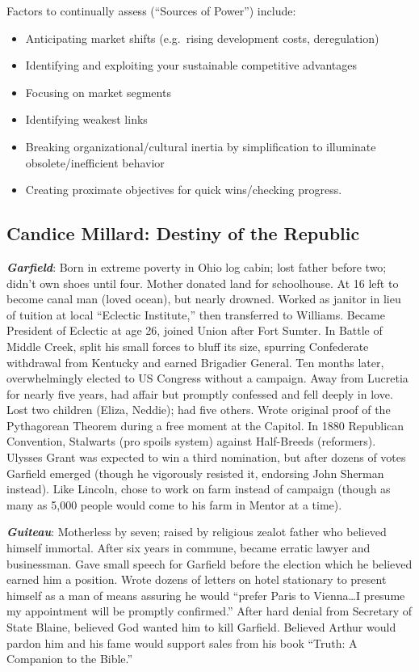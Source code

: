 \documentclass[
]{article}
\begin{document}
Factors to continually assess (``Sources of Power'') include:

\begin{itemize}
\item
  Anticipating market shifts (e.g.~rising development costs,
  deregulation)
\item
  Identifying and exploiting your sustainable competitive advantages
\item
  Focusing on market segments
\item
  Identifying weakest links
\item
  Breaking organizational/cultural inertia by simplification to
  illuminate obsolete/inefficient behavior
\item
  Creating proximate objectives for quick wins/checking progress.
\end{itemize}

\hypertarget{candice-millard-destiny-of-the-republic}{%
\subsection{Candice Millard: Destiny of the
Republic}\label{candice-millard-destiny-of-the-republic}}

\textbf{\emph{Garfield}}: Born in extreme poverty in Ohio log cabin;
lost father before two; didn't own shoes until four. Mother donated land
for schoolhouse. At 16 left to become canal man (loved ocean), but
nearly drowned. Worked as janitor in lieu of tuition at local ``Eclectic
Institute,'' then transferred to Williams. Became President of Eclectic
at age 26, joined Union after Fort Sumter. In Battle of Middle Creek,
split his small forces to bluff its size, spurring Confederate
withdrawal from Kentucky and earned Brigadier General. Ten months later,
overwhelmingly elected to US Congress without a campaign. Away from
Lucretia for nearly five years, had affair but promptly confessed and
fell deeply in love. Lost two children (Eliza, Neddie); had five others.
Wrote original proof of the Pythagorean Theorem during a free moment at
the Capitol. In 1880 Republican Convention, Stalwarts (pro spoils
system) against Half-Breeds (reformers). Ulysses Grant was expected to
win a third nomination, but after dozens of votes Garfield emerged
(though he vigorously resisted it, endorsing John Sherman instead). Like
Lincoln, chose to work on farm instead of campaign (though as many as
5,000 people would come to his farm in Mentor at a time).

\textbf{\emph{Guiteau}}: Motherless by seven; raised by religious zealot
father who believed himself immortal. After six years in commune, became
erratic lawyer and businessman. Gave small speech for Garfield before
the election which he believed earned him a position. Wrote dozens of
letters on hotel stationary to present himself as a man of means
assuring he would ``prefer Paris to Vienna\ldots I presume my
appointment will be promptly confirmed.'' After hard denial from
Secretary of State Blaine, believed God wanted him to kill Garfield.
Believed Arthur would pardon him and his fame would support sales from
his book ``Truth: A Companion to the Bible.''
\end{document}
